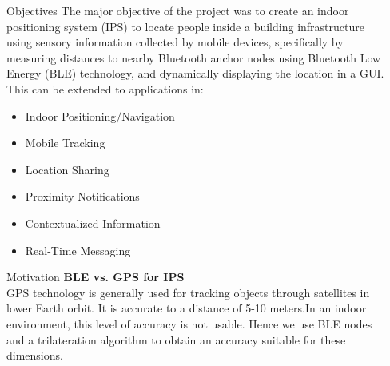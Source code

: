 \documentclass[final]{beamer}
\newlength{\sepwid}
\newlength{\onecolwid}
\begin{document}
\begin{frame}[t] %

\begin{columns}[t] %

\begin{column}{\sepwid}\end{column} %

\begin{column}{\onecolwid} %


\begin{alertblock}{Objectives}
The major objective of the project was to create an indoor positioning system (IPS) to locate people inside a building infrastructure using sensory information collected by mobile devices, specifically by measuring distances to nearby Bluetooth anchor nodes using Bluetooth Low Energy (BLE) technology, and dynamically displaying the location in a GUI. This can be extended to applications in:
\begin{itemize}
\item Indoor Positioning/Navigation
\item Mobile Tracking
\item Location Sharing
\item Proximity Notifications 
\item Contextualized Information
\item Real-Time Messaging
\end{itemize}

\end{alertblock}


\begin{block}{Motivation}
\textbf {BLE vs. GPS for IPS} 
\\
GPS technology is generally used for tracking objects through satellites in lower Earth orbit. It is accurate to a distance of 5-10 meters.In an indoor environment, this level of accuracy is not usable. Hence we use BLE nodes and a trilateration algorithm to obtain an accuracy suitable for these dimensions.
\end{block}



\end{column}
\end{columns}
\end{frame}
\end{document}
